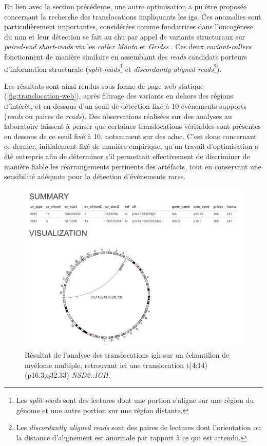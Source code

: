 En lien avec la section précédente, une autre optimisation a pu être proposée
concernant la recherche des translocations impliquants les \glspl{ig}. Ces
anomalies sont particulièrement importantes, considérées comme fondatrices dans
l'oncogènese du \gls{mm} et leur détection se fait au \gls{chu} par appel de
variants structuraux sur \textit{paired-end short-reads} via les
\textit{caller} \textit{Manta} \cite{chenMantaRapidDetection2016a} et
\textit{Gridss} \cite{cameronGRIDSSSensitiveSpecific2017a}. Ces deux
\textit{variant-callers} fonctionnent de manière similaire en assemblant des
\textit{reads} candidats porteurs d'information structurale
(\textit{split-reads}\footnote{Les \textit{split-reads} sont des lectures dont
une portion s'aligne sur une région du génome et une autre portion sur une
région distante.} et \textit{discordantly aligned reads}\footnote{Les
\textit{discordantly aligned reads} sont des paires de lectures dont
l'orientation ou la distance d'alignement est anormale par rapport à ce qui est
attendu.}).

Les résultats sont ainsi rendus sous forme de page web statique
(\autoref{fig:translocation-web}), après filtrage des variants en dehors des
régions d'intérêt, et en dessous d'un seuil de détection fixé à 10 événements
supports (\textit{reads} ou paires de \textit{reads}). Des observations
réalisées sur des analyses au laboratoire laissent à penser que certaines
translocations véritables sont présentes en dessous de ce seuil fixé à 10,
notamment sur des \gls{adnc}. C'est donc concernant ce dernier, initialement
fixé de manière empirique, qu'un travail d'optimisation a été entrepris afin de
déterminer s'il permettait effectivement de discriminer de manière fiable les
réarrangements pertinents des artéfacts, tout en conservant une sensibilité
adéquate pour la détection d'événements rares.

\begin{figure}[H]
    \centering
    \includegraphics[width=1\textwidth]{images/translocation_web.png}
    \caption{
        Résultat de l'analyse des translocations \gls{igh} sur un échantillon de myélome multiple,
        retrouvant ici une translocation t(4;14)(p16.3;q32.33) \textit{NSD2::IGH}.
    }
    \label{fig:translocation-web}
\end{figure}

